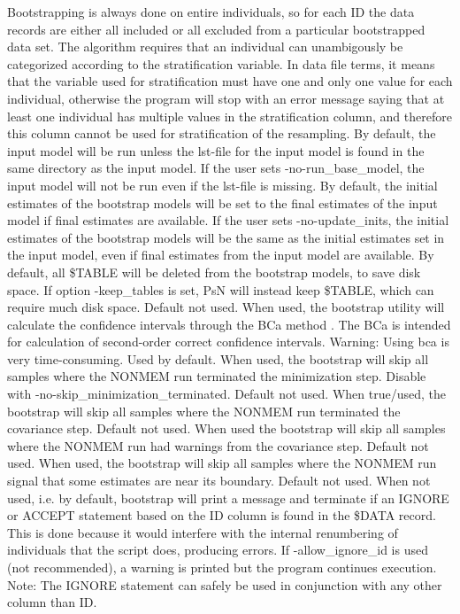 \begin{optionlist}
Bootstrapping is always done on entire individuals, so for each ID the data records are either all included or all excluded from a particular bootstrapped data set.
The algorithm requires that an individual can unambigously be categorized according to the stratification variable. 
In data file terms, it means that the variable used for stratification must have one and only one value for each individual, otherwise the program will stop with an error message saying that at least one individual has multiple values
in the stratification column, and therefore this column cannot be used for stratification of the resampling.
\nextopt
{}
By default, the input model will be run unless the lst-file for the input model is found in the same directory as the input model.
If the user sets -no-run\_base\_model, the input model will not be run even if the lst-file is missing.
By default, the initial estimates of the bootstrap models will be set to the final estimates of the input model if final
estimates are available. If the user sets -no-update\_inits, the initial estimates of the bootstrap models will be
the same as the initial estimates set in the input model, even if final estimates from the input model are available.
By default, all \$TABLE will be deleted from the bootstrap models, to save disk space. If option -keep\_tables is set, 
PsN will instead keep \$TABLE, which can require much disk space.
\nextopt
{}
Default not used. When used, the bootstrap utility will calculate the confidence intervals through the BCa method \cite{Efron}. The BCa is intended for calculation of second-order correct confidence intervals. Warning: Using bca is very time-consuming. 
\nextopt
{}
Used by default. When used, the bootstrap will skip all samples where the NONMEM run terminated the minimization step. Disable with -no-skip\_minimization\_terminated. 
\nextopt
{}
Default not used. When true/used, the bootstrap will skip all samples where the NONMEM run terminated the covariance step. 
\nextopt
{}
Default not used. When used the bootstrap will skip all samples where the NONMEM run had warnings from the covariance step. 
\nextopt
{}
Default not used. When used, the bootstrap will skip all samples where the NONMEM run signal that some estimates are near its boundary. 
\nextopt
{}
Default not used. When not used, i.e. by default, bootstrap will print a message and terminate if an IGNORE or ACCEPT statement based on the ID column is found in the \$DATA record. This is done because it would interfere with the internal renumbering of individuals that the script does, producing errors. If -allow\_ignore\_id is used (not recommended), a warning is printed but the program continues execution. Note: The IGNORE statement can safely be used in conjunction with any other column than ID. 

\end{optionlist}
